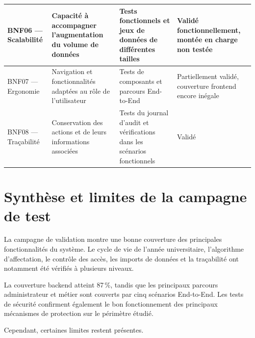 \begin{longtable}{|p{2.6cm}|p{4.3cm}|p{4.3cm}|p{3.2cm}|}
\hline

BNF06 --- Scalabilité &
Capacité à accompagner l'augmentation du volume de données &
Tests fonctionnels et jeux de données de différentes tailles &
Validé fonctionnellement, montée en charge non testée \\

\hline

BNF07 --- Ergonomie &
Navigation et fonctionnalités adaptées au rôle de l'utilisateur &
Tests de composants et parcours End-to-End &
Partiellement validé, couverture frontend encore inégale \\

\hline

BNF08 --- Traçabilité &
Conservation des actions et de leurs informations associées &
Tests du journal d'audit et vérifications dans les scénarios fonctionnels &
Validé \\

\hline

\end{longtable}


\section{Synthèse et limites de la campagne de test}

\label{sec:synthese-limites}


La campagne de validation montre une bonne couverture des principales fonctionnalités du système. Le cycle de vie de l'année universitaire, l'algorithme d'affectation, le contrôle des accès, les imports de données et la traçabilité ont notamment été vérifiés à plusieurs niveaux.

La couverture backend atteint 87\,\%, tandis que les principaux parcours administrateur et métier sont couverts par cinq scénarios End-to-End. Les tests de sécurité confirment également le bon fonctionnement des principaux mécanismes de protection sur le périmètre étudié.

Cependant, certaines limites restent présentes.

